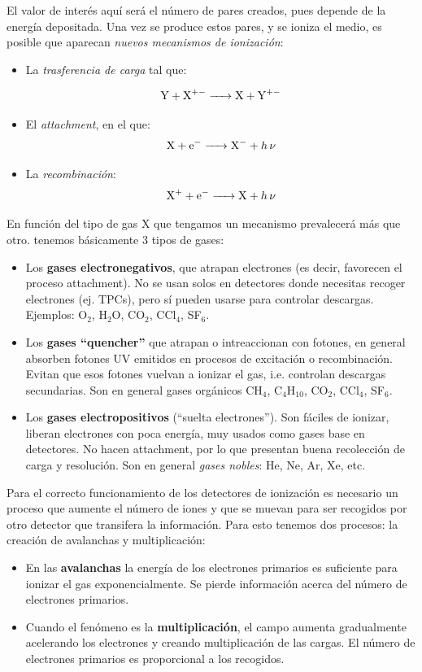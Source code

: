 El valor de interés aquí será el número de pares creados, pues depende de la energía depositada. Una vez se produce estos pares, y se ioniza el medio, es posible que aparecan \textit{nuevos mecanismos de ionización}: 

\begin{itemize}
    \item La \textit{trasferencia de carga} tal que:

    \[ \ce{ Y + X^+- -> X + Y^+-} \]

    \item El \textit{attachment}, en el que:
    \[ \ce{X + e- -> X^- + h \nu} \]

    \item La \textit{recombinación}: 
    \[ \ce{X^+ + e- -> X + h \nu} \]
\end{itemize}

En función del tipo de gas X que tengamos un mecanismo prevalecerá más que otro. tenemos básicamente 3 tipos de gases:

\begin{itemize}
    \item   Los \textbf{gases electronegativos}, que atrapan electrones (es decir, favorecen el proceso attachment). No se usan solos en detectores donde necesitas recoger electrones (ej. TPCs), pero sí pueden usarse para controlar descargas. Ejemplos: O$_2$,  H$_2$O, CO$_2$, CCl$_4$, SF$_6$.
    \item Los \textbf{gases ``quencher''} que atrapan o intreaccionan con fotones, en general  absorben fotones UV emitidos en procesos de excitación o recombinación. Evitan que esos fotones vuelvan a ionizar el gas, i.e. controlan descargas secundarias. Son en general gases orgánicos CH$_4$, C$_4$H$_{10}$, CO$_2$, CCl$_4$, SF$_6$. 
    \item Los \textbf{gases electropositivos} (``suelta electrones''). Son fáciles de ionizar, liberan electrones con poca energía, muy usados como gases base en detectores. No hacen attachment, por lo que presentan buena recolección de carga y resolución. Son en general \textit{gases nobles}: He, Ne, Ar, Xe, etc.
\end{itemize}   

Para el correcto funcionamiento de los detectores de ionización es necesario un proceso que aumente el número de iones y que se muevan para ser recogidos por otro detector que transifera la información. Para esto tenemos dos procesos: la creación de avalanchas y multiplicación:

\begin{itemize}
    \item En las \textbf{avalanchas} la energía de los electrones primarios es suficiente para ionizar el gas exponencialmente. Se pierde información acerca del número de electrones primarios.
    \item Cuando el fenómeno es la \textbf{multiplicación}, el campo aumenta gradualmente acelerando los electrones y creando multiplicación de las cargas. El número de electrones primarios es proporcional a los recogidos. 
\end{itemize}

